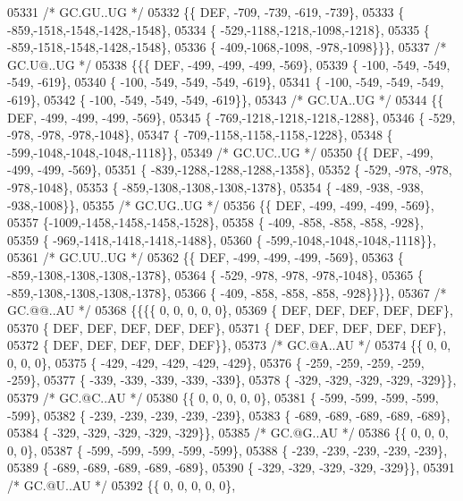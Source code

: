 \begin{DoxyCode}
05331 \textcolor{comment}{/* GC.GU..UG */}
05332 \{\{  DEF, -709, -739, -619, -739\},
05333 \{ -859,-1518,-1548,-1428,-1548\},
05334 \{ -529,-1188,-1218,-1098,-1218\},
05335 \{ -859,-1518,-1548,-1428,-1548\},
05336 \{ -409,-1068,-1098, -978,-1098\}\}\},
05337 \textcolor{comment}{/* GC.U@..UG */}
05338 \{\{\{  DEF, -499, -499, -499, -569\},
05339 \{ -100, -549, -549, -549, -619\},
05340 \{ -100, -549, -549, -549, -619\},
05341 \{ -100, -549, -549, -549, -619\},
05342 \{ -100, -549, -549, -549, -619\}\},
05343 \textcolor{comment}{/* GC.UA..UG */}
05344 \{\{  DEF, -499, -499, -499, -569\},
05345 \{ -769,-1218,-1218,-1218,-1288\},
05346 \{ -529, -978, -978, -978,-1048\},
05347 \{ -709,-1158,-1158,-1158,-1228\},
05348 \{ -599,-1048,-1048,-1048,-1118\}\},
05349 \textcolor{comment}{/* GC.UC..UG */}
05350 \{\{  DEF, -499, -499, -499, -569\},
05351 \{ -839,-1288,-1288,-1288,-1358\},
05352 \{ -529, -978, -978, -978,-1048\},
05353 \{ -859,-1308,-1308,-1308,-1378\},
05354 \{ -489, -938, -938, -938,-1008\}\},
05355 \textcolor{comment}{/* GC.UG..UG */}
05356 \{\{  DEF, -499, -499, -499, -569\},
05357 \{-1009,-1458,-1458,-1458,-1528\},
05358 \{ -409, -858, -858, -858, -928\},
05359 \{ -969,-1418,-1418,-1418,-1488\},
05360 \{ -599,-1048,-1048,-1048,-1118\}\},
05361 \textcolor{comment}{/* GC.UU..UG */}
05362 \{\{  DEF, -499, -499, -499, -569\},
05363 \{ -859,-1308,-1308,-1308,-1378\},
05364 \{ -529, -978, -978, -978,-1048\},
05365 \{ -859,-1308,-1308,-1308,-1378\},
05366 \{ -409, -858, -858, -858, -928\}\}\}\},
05367 \textcolor{comment}{/* GC.@@..AU */}
05368 \{\{\{\{    0,    0,    0,    0,    0\},
05369 \{  DEF,  DEF,  DEF,  DEF,  DEF\},
05370 \{  DEF,  DEF,  DEF,  DEF,  DEF\},
05371 \{  DEF,  DEF,  DEF,  DEF,  DEF\},
05372 \{  DEF,  DEF,  DEF,  DEF,  DEF\}\},
05373 \textcolor{comment}{/* GC.@A..AU */}
05374 \{\{    0,    0,    0,    0,    0\},
05375 \{ -429, -429, -429, -429, -429\},
05376 \{ -259, -259, -259, -259, -259\},
05377 \{ -339, -339, -339, -339, -339\},
05378 \{ -329, -329, -329, -329, -329\}\},
05379 \textcolor{comment}{/* GC.@C..AU */}
05380 \{\{    0,    0,    0,    0,    0\},
05381 \{ -599, -599, -599, -599, -599\},
05382 \{ -239, -239, -239, -239, -239\},
05383 \{ -689, -689, -689, -689, -689\},
05384 \{ -329, -329, -329, -329, -329\}\},
05385 \textcolor{comment}{/* GC.@G..AU */}
05386 \{\{    0,    0,    0,    0,    0\},
05387 \{ -599, -599, -599, -599, -599\},
05388 \{ -239, -239, -239, -239, -239\},
05389 \{ -689, -689, -689, -689, -689\},
05390 \{ -329, -329, -329, -329, -329\}\},
05391 \textcolor{comment}{/* GC.@U..AU */}
05392 \{\{    0,    0,    0,    0,    0\},

\end{DoxyCode}
